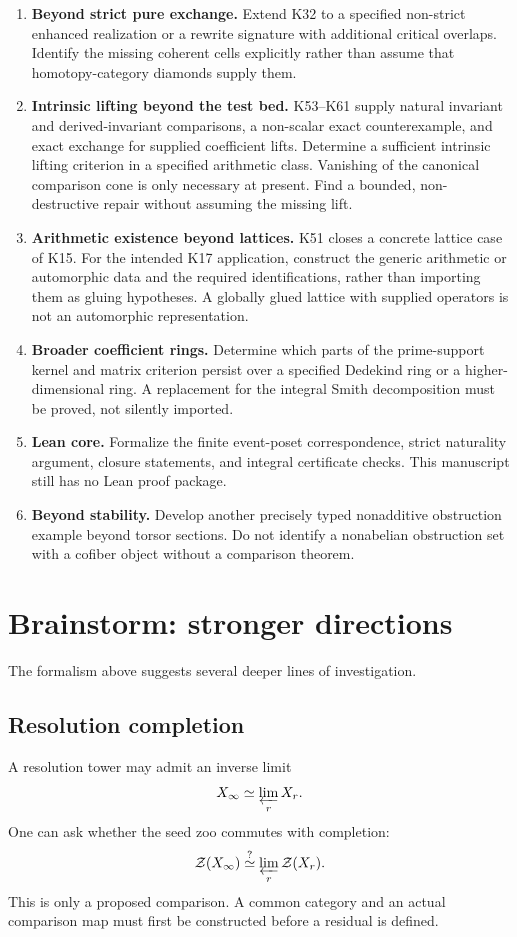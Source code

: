 \documentclass[11pt]{article}
\theoremstyle{definition}
\theoremstyle{remark}
\newcommand{\Zoo}{\mathcal Z}
\begin{document}
\begin{enumerate}
\item \textbf{Beyond strict pure exchange.} Extend K32 to a specified non-strict enhanced realization or a rewrite signature with additional critical overlaps. Identify the missing coherent cells explicitly rather than assume that homotopy-category diamonds supply them.
\item \textbf{Intrinsic lifting beyond the test bed.} K53--K61 supply natural invariant and derived-invariant comparisons, a non-scalar exact counterexample, and exact exchange for supplied coefficient lifts. Determine a sufficient intrinsic lifting criterion in a specified arithmetic class. Vanishing of the canonical comparison cone is only necessary at present. Find a bounded, non-destructive repair without assuming the missing lift.
\item \textbf{Arithmetic existence beyond lattices.} K51 closes a concrete lattice case of K15. For the intended K17 application, construct the generic arithmetic or automorphic data and the required identifications, rather than importing them as gluing hypotheses. A globally glued lattice with supplied operators is not an automorphic representation.
\item \textbf{Broader coefficient rings.} Determine which parts of the prime-support kernel and matrix criterion persist over a specified Dedekind ring or a higher-dimensional ring. A replacement for the integral Smith decomposition must be proved, not silently imported.
\item \textbf{Lean core.} Formalize the finite event-poset correspondence, strict naturality argument, closure statements, and integral certificate checks. This manuscript still has no Lean proof package.
\item \textbf{Beyond stability.} Develop another precisely typed nonadditive obstruction example beyond torsor sections. Do not identify a nonabelian obstruction set with a cofiber object without a comparison theorem.
\end{enumerate}

\section{Brainstorm: stronger directions}

The formalism above suggests several deeper lines of investigation.

\subsection{Resolution completion}
A resolution tower may admit an inverse limit
\[
X_\infty\simeq\varprojlim_r X_r.
\]
One can ask whether the seed zoo commutes with completion:
\[
\Zoo(X_\infty)
\stackrel{?}{\simeq}
\varprojlim_r\Zoo(X_r).
\]
This is only a proposed comparison. A common category and an actual comparison map must first be constructed before a residual is defined.
\end{document}
